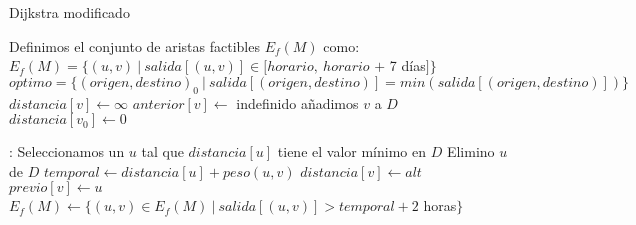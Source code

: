 \begin{algorithm}[H]
\caption{Dijkstra modificado}\label{dijkstra_modificado}
\begin{algorithmic}[1]
\State Definimos el conjunto de aristas factibles $E_{f}(M)$ como: $E_{f}(M) = \{(u,v)\ |\ salida[(u, v)] \in [horario,\  horario$ $+$ 7 días$]\}$
	\State $optimo = \{{(origen, destino)}_{0}\ |\ salida[(origen, destino)] = min(salida[(origen, destino)])\}$
\Else
		\State $distancia[v] \gets \infty$
		\State $anterior[v] \gets $ indefinido
		\State añadimos $v$ a $D$
	\EndFor
	\State $distancia[v_{0}] \gets 0$
	
	:
		\State Seleccionamos un $u$ tal que $distancia[u]$ tiene el valor mínimo en $D$
		\State Elimino $u$ de $D$
			\State $temporal \gets distancia[u] + peso(u, v)$
				\State $distancia[v] \gets alt$
				\State $previo[v] \gets u$
				\State $E_{f}(M) \gets \{(u, v) \in E_{f}(M)\ |\ salida[(u,v)] > temporal + 2$ horas$\}$
			\EndIf
		\EndFor
	\EndWhile
\EndIf
\EndProcedure
\end{algorithmic}
\end{algorithm}
